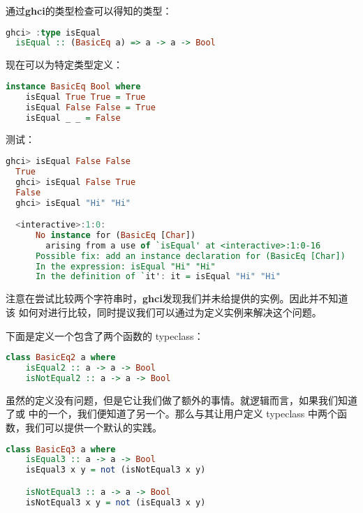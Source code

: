 \documentclass[./main.tex]{subfiles}
\begin{document}
通过\textbf{ghci}的类型检查可以得知的类型：

\begin{lstlisting}[language=Haskell]
  ghci> :type isEqual
  isEqual :: (BasicEq a) => a -> a -> Bool
\end{lstlisting}

现在可以为特定类型定义：

\begin{lstlisting}[language=Haskell]
  instance BasicEq Bool where
    isEqual True True = True
    isEqual False False = True
    isEqual _ _ = False
\end{lstlisting}

测试：

\begin{lstlisting}[language=Haskell]
  ghci> isEqual False False
  True
  ghci> isEqual False True
  False
  ghci> isEqual "Hi" "Hi"

  <interactive>:1:0:
      No instance for (BasicEq [Char])
        arising from a use of `isEqual' at <interactive>:1:0-16
      Possible fix: add an instance declaration for (BasicEq [Char])
      In the expression: isEqual "Hi" "Hi"
      In the definition of `it': it = isEqual "Hi" "Hi"
\end{lstlisting}

注意在尝试比较两个字符串时，\textbf{ghci}发现我们并未给提供的实例。因此并不知道该
如何对进行比较，同时提议我们可以通过为\acode{[Char]}定义实例来解决这个问题。

下面是定义一个包含了两个函数的 typeclass：

\begin{lstlisting}[language=Haskell]
  class BasicEq2 a where
    isEqual2 :: a -> a -> Bool
    isNotEqual2 :: a -> a -> Bool
\end{lstlisting}

虽然的定义没有问题，但是它让我们做了额外的事情。就逻辑而言，如果我们知道了或
中的一个，我们便知道了另一个。那么与其让用户定义 typeclass 中两个函数，我们可以提供一个默认的实践。

\begin{lstlisting}[language=Haskell]
  class BasicEq3 a where
    isEqual3 :: a -> a -> Bool
    isEqual3 x y = not (isNotEqual3 x y)

    isNotEqual3 :: a -> a -> Bool
    isNotEqual3 x y = not (isEqual3 x y)
\end{lstlisting}
\end{document}
